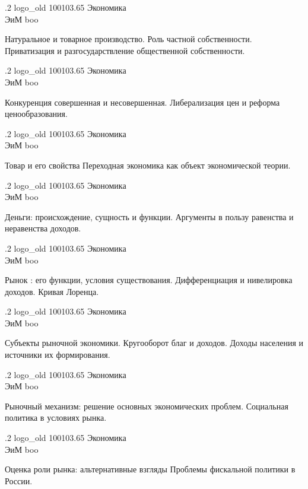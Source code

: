 \documentclass[
	12pt,
	a4paper,
	]
	{article}
\newcommand{\shapkFull}{
	\shapk
		{.2}
		{logo_old}
		{100103.65}
		{Экономика\\}
		{ЭиМ}
		{boo}
}
\begin{document}
\newpage


\shapkFull
\setcounter{zad}{0}

\z 	Натуральное и товарное производство. Роль частной собственности.
 \medskip
\z 	Приватизация и разгосударствление общественной собственности.
 \medskip

\newpage


\shapkFull
\setcounter{zad}{0}

\z 	Конкуренция совершенная и несовершенная.
 \medskip
\z 	Либерализация цен и реформа ценообразования.
 \medskip

\newpage


\shapkFull
\setcounter{zad}{0}

\z 	Товар и его свойства
 \medskip
\z 	Переходная экономика как объект экономической теории.
 \medskip

\newpage


\shapkFull
\setcounter{zad}{0}

\z 	Деньги: происхождение, сущность и функции.
 \medskip
\z 	Аргументы в пользу равенства и неравенства доходов.
 \medskip

\newpage


\shapkFull
\setcounter{zad}{0}

\z 	Рынок : его функции, условия существования.
 \medskip
\z 	Дифференциация и нивелировка доходов.  Кривая Лоренца.
 \medskip

\newpage


\shapkFull
\setcounter{zad}{0}

\z 	Субъекты рыночной экономики.  Кругооборот благ и доходов.
 \medskip
\z 	Доходы населения и источники их  формирования.
 \medskip

\newpage


\shapkFull
\setcounter{zad}{0}

\z 	Рыночный механизм: решение основных экономических проблем.
 \medskip
\z 	Социальная политика в условиях рынка.
 \medskip

\newpage


\shapkFull
\setcounter{zad}{0}

\z 	Оценка роли рынка: альтернативные взгляды
 \medskip
\z 	Проблемы фискальной политики в России.
 \medskip
\end{document}
